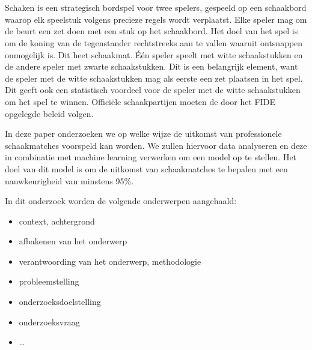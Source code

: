 
\chapter{}%
\label{ch:inleiding}

Schaken is een strategisch bordspel voor twee spelers, gespeeld op een schaakbord waarop elk speelstuk volgens precieze regels wordt verplaatst. Elke speler mag om de beurt een zet doen met een stuk op het schaakbord. Het doel van het spel is om de koning van de tegenstander rechtstreeks aan te vallen waaruit ontsnappen onmogelijk is. Dit heet schaakmat. Één speler speelt met witte schaakstukken en de andere speler met zwarte schaakstukken. Dit is een belangrijk element, want de speler met de witte schaakstukken mag als eerste een zet plaatsen in het spel. Dit geeft ook een statistisch voordeel voor de speler met de witte schaakstukken om het spel te winnen. Officiële schaakpartijen moeten de door het FIDE opgelegde beleid volgen.

In deze paper onderzoeken we op welke wijze de uitkomst van professionele schaakmatches voorspeld kan worden. We zullen hiervoor data analyseren en deze in combinatie met machine learning verwerken om een model op te stellen. Het doel van dit model is om de uitkomst van schaakmatches te bepalen met een nauwkeurigheid van minstens 95\%.

In dit onderzoek worden de volgende onderwerpen aangehaald:
\begin{itemize}
    \item context, achtergrond
    \item afbakenen van het onderwerp
    \item verantwoording van het onderwerp, methodologie
    \item probleemstelling
    \item onderzoeksdoelstelling
    \item onderzoeksvraag
    \item \ldots
\end{itemize}

\section{}%
\label{sec:probleemstelling}

